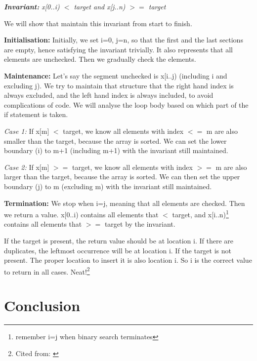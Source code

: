 \begin{center}
    \textit{\textbf{Invariant:}\hspace{6mm} x[0..i) $<$ target and x[j..n) $>=$ target}
\end{center}

We will show that maintain this invariant from start to finish. 


\textbf{Initialisation:} Initially, we set i=0, j=n, so that the first and the last sections are empty, hence satisfying the invariant trivially. It also represents that all elements are unchecked. Then we gradually check the elements.


\textbf{Maintenance:} Let's say the segment unchecked is x[i..j) (including i and excluding j). We try to maintain that structure that the right hand index is always excluded, and the left hand index is always included, to avoid complications of code. We will analyse the loop body based on which part of the if statement is taken.

\textit{Case 1:} If x[m] $<$ target, we know all elements with index $<=$ m are also smaller than the target, because the array is sorted. We can set the lower boundary (i) to m+1 (including m+1) with the invariant still maintained.

\textit{Case 2:} If x[m] $>=$ target, we know all elements with index $>=$ m are also larger than the target, because the array is sorted. We can then set the upper boundary (j) to m (excluding m) with the invariant still maintained.


\textbf{Termination:} We stop when i=j, meaning that all elements are checked. Then we return a value. x[0..i) contains all elements that $<$ target, and x[i..n)\footnote{remember i=j when binary search terminates} contains all elements that $>=$ target by the invariant. 

If the target is present, the return value should be at location i. If there are duplicates, the leftmost occurrence will be at location i. If the target is not present. The proper location to insert it is also location i. So i is the correct value to return in all cases. Neat!\footnote{Cited from: \cite{ip:binsearch}}



\fi

\section{Conclusion}


